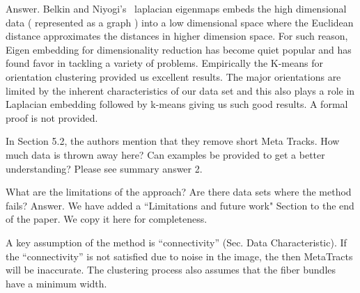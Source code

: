 \documentclass[]{article}
\begin{document}
\color{black}
Answer. Belkin  and Niyogi's~\cite{Belkin01} laplacian eigenmaps embeds the high dimensional data ( represented as a graph ) into a low dimensional space where the Euclidean distance approximates the distances in higher dimension space. For such reason, Eigen embedding for dimensionality reduction has become quiet popular and has found favor in tackling a variety of problems. Empirically the K-means for orientation clustering provided us excellent results. The major orientations are limited by the inherent characteristics of our data set and this also plays a role in Laplacian embedding followed by k-means giving us such good results. A formal proof is not provided. 

\color{red}
In Section 5.2, the authors mention that they remove short Meta Tracks.
How much data is thrown away here? Can examples be provided to get a
better understanding?
\color{black}
Please see summary answer 2.

\color{red}
What are the limitations of the approach? Are there data sets where the
method fails?
\color{black}
Answer. We have added a ``Limitations and future work" Section to the end of the paper. We copy it here for completeness.


 A key assumption of the method is ``connectivity'' (Sec. Data Characteristic).
 If the ``connectivity'' is not satisfied due to noise in the image, the then MetaTracts will be inaccurate. 
 The clustering process also assumes that the fiber bundles have a minimum width. 


\end{document}
